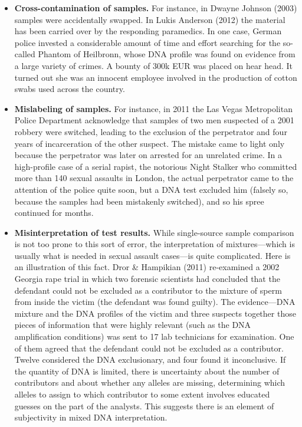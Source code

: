 \documentclass[
  10pt,
  dvipsnames,enabledeprecatedfontcommands]{scrartcl}
\begin{document}
\begin{itemize}
\item
  \textbf{Cross-contamination of samples.} For instance, in Dwayne
  Johnson (2003) samples were accidentally swapped. In Lukis Anderson
  (2012) the material has been carried over by the responding
  paramedics. In one case, German police invested a considerable amount
  of time and effort searching for the so-called Phantom of Heilbronn,
  whose DNA profile was found on evidence from a large variety of
  crimes. A bounty of 300k EUR was placed on hear head. It turned out
  she was an innocent employee involved in the production of cotton
  swabs used across the country.
\item
  \textbf{Mislabeling of samples.} For instance, in 2011 the Las Vegas
  Metropolitan Police Department acknowledge that samples of two men
  suspected of a 2001 robbery were switched, leading to the exclusion of
  the perpetrator and four years of incarceration of the other suspect.
  The mistake came to light only because the perpetrator was later on
  arrested for an unrelated crime. In a high-profile case of a serial
  rapist, the notorious Night Stalker who committed more than 140 sexual
  assaults in London, the actual perpetrator came to the attention of
  the police quite soon, but a DNA test excluded him (falsely so,
  because the samples had been mistakenly switched), and so his spree
  continued for months.
\item
  \textbf{Misinterpretation of test results.} While single-source sample
  comparison is not too prone to this sort of error, the interpretation
  of mixtures---which is usually what is needed in sexual assault
  cases---is quite complicated. Here is an illustration of this fact.
  Dror \& Hampikian (2011) re-examined a 2002 Georgia rape trial in
  which two forensic scientists had concluded that the defendant could
  not be excluded as a contributor to the mixture of sperm from inside
  the victim (the defendant was found guilty). The evidence---DNA
  mixture and the DNA profiles of the victim and three suspects together
  those pieces of information that were highly relevant (such as the DNA
  amplification conditions) was sent to 17 lab technicians for
  examination. One of them agreed that the defendant could not be
  excluded as a contributor. Twelve considered the DNA exclusionary, and
  four found it inconclusive. If the quantity of DNA is limited, there
  is uncertainty about the number of contributors and about whether any
  alleles are missing, determining which alleles to assign to which
  contributor to some extent involves educated guesses on the part of
  the analysts. This suggests there is an element of subjectivity in
  mixed DNA interpretation.
\end{itemize}
\end{document}
